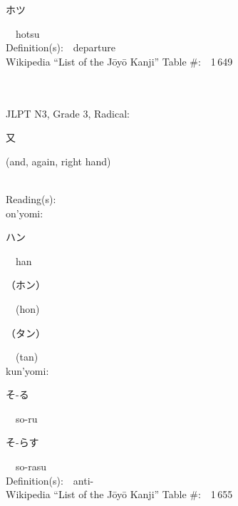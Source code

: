 \begin{multicols}{2}
{\hspace*{2em}}{\begin{CJK}{UTF8}{min} ホツ \end{CJK}}\ \ hotsu\ \ \\
Definition(s):\ \ departure \\
Wikipedia ``List of the J\=oy\=o Kanji'' Table \#:\ \ 1\,649 \\
\ \ \\
{\fontsize{34pt}{40pt}  }\ \ \\  %
{JLPT N3, Grade 3, Radical:\ \ {\begin{CJK}{UTF8}{min} 又 \end{CJK}} (and, again, right hand) } \\
Reading(s):\ \ \\
{\hspace*{1em}}on'yomi:\ \ \\
{\hspace*{2em}}{\begin{CJK}{UTF8}{min} ハン \end{CJK}}\ \ han\ \ \\
{\hspace*{2em}}{\begin{CJK}{UTF8}{min} （ホン） \end{CJK}}\ \ (hon)\ \ \\
{\hspace*{2em}}{\begin{CJK}{UTF8}{min} （タン） \end{CJK}}\ \ (tan)\ \ \\
{\hspace*{1em}}kun'yomi:\ \ \\
{\hspace*{2em}}{\begin{CJK}{UTF8}{min} そ-る \end{CJK}}\ \ so-ru\ \ \\
{\hspace*{2em}}{\begin{CJK}{UTF8}{min} そ-らす \end{CJK}}\ \ so-rasu\ \ \\
Definition(s):\ \ anti- \\
Wikipedia ``List of the J\=oy\=o Kanji'' Table \#:\ \ 1\,655 \\
\ \ \\

\end{multicols}
